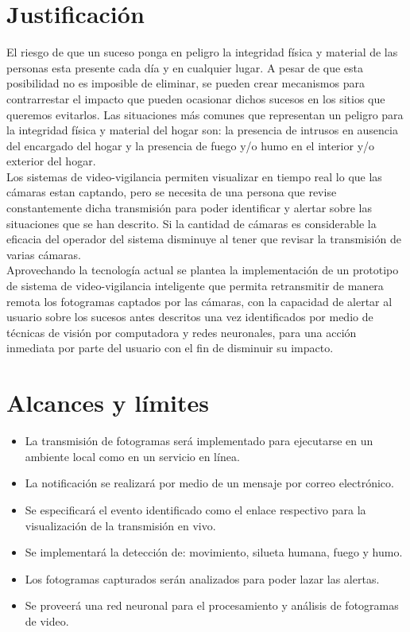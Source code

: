 \section{Justificación}
El riesgo de que un suceso ponga en peligro la integridad física y material de las personas esta presente cada día y en cualquier lugar. A pesar de que esta posibilidad no es imposible de eliminar, se pueden crear mecanismos para contrarrestar el impacto que pueden ocasionar dichos sucesos en los sitios que queremos evitarlos. Las situaciones más comunes que representan un peligro para la integridad física y material del hogar son: la presencia de intrusos en ausencia del encargado del hogar y la presencia de fuego y/o humo en el interior y/o exterior del hogar.\\

Los sistemas de video-vigilancia permiten visualizar en tiempo real lo que las cámaras estan captando, pero se necesita de una persona que revise constantemente dicha transmisión para poder identificar y alertar sobre las situaciones que se han descrito. Si la cantidad de cámaras es considerable la eficacia del operador del sistema disminuye al tener que revisar la transmisión de varias cámaras.\\

Aprovechando la tecnología actual se plantea la implementación de un prototipo de sistema de video-vigilancia inteligente que permita retransmitir de manera remota los fotogramas captados por las cámaras, con la capacidad de alertar al usuario sobre los sucesos antes descritos una vez identificados por medio de técnicas de visión por computadora y redes neuronales, para una acción inmediata por parte del usuario con el fin de disminuir su impacto.

\section{Alcances y límites}
\begin{itemize}
    \item La transmisión de fotogramas será implementado para ejecutarse en un ambiente local como en un servicio en línea.
    \item La notificación se realizará por medio de un mensaje por correo electrónico.
    \item Se especificará el evento identificado como el enlace respectivo para la visualización de la transmisión en vivo.
    \item Se implementará la detección de: movimiento, silueta humana, fuego y humo.
    \item Los fotogramas capturados serán analizados para poder lazar las alertas.
    \item Se proveerá una red neuronal para el procesamiento y análisis de fotogramas de video.
\end{itemize}